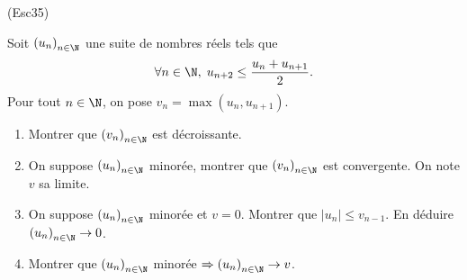 \begin{tiny}(Esc35)\end{tiny} Soit $\left( u_n \right)_{n \in \N}$ une suite de nombres réels tels que
\[
 \forall n \in \N,\; u_{n+2} \leq \frac{u_n + u_{n+1}}{2}.
\]
Pour tout $n\in \N$, on pose $v_n = \max(u_n,u_{n+1})$.
\begin{enumerate}
 \item Montrer que $\left( v_n \right)_{n \in \N}$ est décroissante.
 \item On suppose $\left( u_n \right)_{n \in \N}$ minorée, montrer que $\left( v_n \right)_{n \in \N}$ est convergente. On note $v$ sa limite.
 \item On suppose $\left( u_n \right)_{n \in \N}$ minorée et $v= 0$. Montrer que $|u_n| \leq v_{n-1}$. En déduire $\left( u_n \right)_{n \in \N} \rightarrow 0$.
 \item Montrer que $\left( u_n \right)_{n \in \N}$ minorée $\Rightarrow \left( u_n \right)_{n \in \N} \rightarrow v$.
\end{enumerate}
